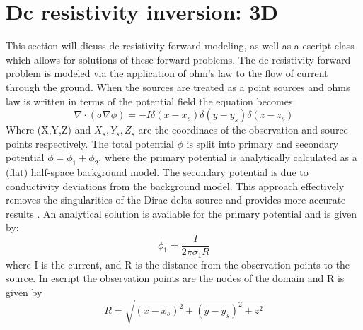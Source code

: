 %
%
%

\section{Dc resistivity inversion: 3D}\label{sec:forward DCRES}
This section will dicuss dc resistivity forward modeling, as well as a escript
class which allows for solutions of these forward problems. The dc resistivity 
forward problem is modeled via the application of ohm's law to the flow of current
through the ground. When the sources are treated as a point sources and ohms law 
is written in terms of the potential field the equation becomes:
\begin{equation} \label{ref:dcres:eq1}
\nabla \cdot (\sigma \nabla \phi) = -I \delta(x-x_s) \delta(y-y_s) \delta(z-z_s)
\end{equation}
Where (X,Y,Z) and $X_s, Y_s, Z_s$ are the coordinaes of the observation and source
points respectively. The total potential $\phi$ is split into primary and secondary 
potential $\phi = \phi_1 + \phi_2$, where the primary potential is analytically calculated 
as a (flat) half-space background model. The secondary potential is due to conductivity deviations 
from the background model. This approach effectively removes the singularities of the Dirac delta 
source and provides more accurate results \cite{rucker2006three}.
An analytical solution is available for the primary potential and is given by:
\begin{equation} \label{ref:dcres:eq2}
\phi_1 = \frac{I}{2 \pi \sigma_1 R}
\end{equation}
where I is the current, and R is the distance from the observation points to the source.
In escript the observation points are the nodes of the domain and R is given by
\begin{equation} \label{ref:dcres:eq3}
R = \sqrt{(x-x_s)^2+(y-y_s)^2 + z^2}
\end{equation}
